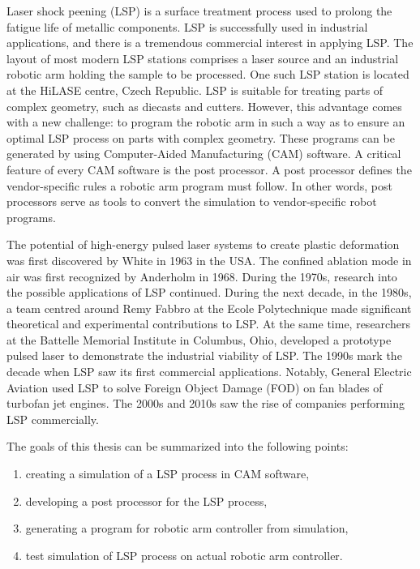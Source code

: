 

Laser shock peening (LSP) is a surface treatment process used to prolong the fatigue life of metallic components. LSP is successfully used in industrial applications, and there is a tremendous commercial interest in applying LSP. The layout of most modern LSP stations comprises a laser source and an industrial robotic arm holding the sample to be processed. One such LSP station is located at the HiLASE centre, Czech Republic. LSP is suitable for treating parts of complex geometry, such as diecasts and cutters. However, this advantage comes with a new challenge: to program the robotic arm in such a way as to ensure an optimal LSP process on parts with complex geometry. These programs can be generated by using Computer-Aided Manufacturing (CAM) software. A critical feature of every CAM software is the post processor. A post processor defines the vendor-specific rules a robotic arm program must follow.  In other words, post processors serve as tools to convert the simulation to vendor-specific robot programs.

The potential of high-energy pulsed laser systems to create plastic deformation was first discovered by White in 1963 in the USA. The confined ablation mode in air was first recognized by Anderholm in 1968. During the 1970s, research into the possible applications of LSP continued. During the next decade, in the 1980s, a team centred around Remy Fabbro at the Ecole Polytechnique made significant theoretical and experimental contributions to LSP. At the same time, researchers at the Battelle Memorial Institute in Columbus, Ohio, developed a prototype pulsed laser to demonstrate the industrial viability of LSP. The 1990s mark the decade when LSP saw its first commercial applications. Notably, General Electric Aviation used LSP to solve Foreign Object Damage (FOD) on fan blades of turbofan jet engines. The 2000s and 2010s saw the rise of companies performing LSP commercially.

The goals of this thesis can be summarized into the following points:
\begin{enumerate}

    \item creating a simulation of a LSP process in CAM software,
    \item developing a post processor for the LSP process, 
    \item generating a program  for robotic arm controller from simulation,
    \item test simulation of LSP process on actual robotic arm controller.
    
\end{enumerate}

